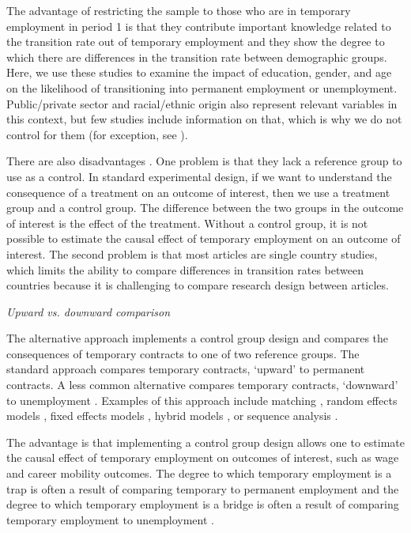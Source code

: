 \documentclass[12pt]{article}
\begin{document}
The advantage of restricting the sample to those who are in temporary employment in period 1 is that they contribute important knowledge related to the transition rate out of temporary employment and they show the degree to which there are differences in the transition rate between demographic groups.  Here, we use these studies to examine the impact of education, gender, and age on the likelihood of transitioning into permanent employment or unemployment.  Public/private sector and racial/ethnic origin also represent relevant variables in this context, but few studies include information on that, which is why we do not control for them (for exception, see \citealp{giesecke_gross_2003,giesecke_gross_2004}).  

There are also disadvantages \citep{gebel_2013}.  One problem is that they lack a reference group to use as a control.  In standard experimental design, if we want to understand the consequence of a treatment on an outcome of interest, then we use a treatment group and a control group.  The difference between the two groups in the outcome of interest is the effect of the treatment.  Without a control group, it is not possible to estimate the causal effect of temporary employment on an outcome of interest.  The second problem is that most articles are single country studies, which limits the ability to compare differences in transition rates between countries because it is challenging to compare research design between articles.  

\emph{Upward vs. downward comparison}

The alternative approach implements a control group design and compares the consequences of temporary contracts to one of two reference groups.  The standard approach compares temporary contracts, `upward' to permanent contracts.  A less common alternative compares temporary contracts, `downward' to unemployment \citep{korpi_levin_2001,gebel_2013}.  Examples of this approach include matching \citep{gash_mcginnity_2007}, random effects models \citep{giesecke_gross_2003}, fixed effects models \citep{booth_etal_2002}, hybrid models \citep{mooi-reci_wooden_2017}, or sequence analysis \citep{fauser_2020}.

The advantage is that implementing a control group design allows one to estimate the causal effect of temporary employment on outcomes of interest, such as wage and career mobility outcomes.  The degree to which temporary employment is a trap is often a result of comparing temporary to permanent employment and the degree to which temporary employment is a bridge is often a result of comparing temporary employment to unemployment \citep{fuller_2011}.  
\end{document}

